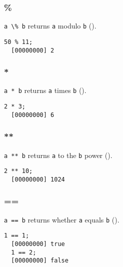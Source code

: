 \subsubsection{\%}

\lstinline|a \% b| returns \lstinline|a| modulo \lstinline|b| ().

\begin{lstlisting}[caption=Float.'\%', label=lst:float-mod, float=\floatposh]
  50 % 11;
  [00000000] 2
\end{lstlisting}

\subsubsection{*}

\lstinline|a * b| returns \lstinline|a| times \lstinline|b| ().

\begin{lstlisting}[caption=Float.'*', label=lst:float-times, float=\floatposh]
  2 * 3;
  [00000000] 6
\end{lstlisting}

\subsubsection{**}

\lstinline|a ** b| returns \lstinline|a| to the \lstinline|b| power ().

\begin{lstlisting}[caption=Float.'**', label=lst:float-exp, float=\floatposh]
  2 ** 10;
  [00000000] 1024
\end{lstlisting}

\subsubsection{==}

\lstinline|a == b| returns whether \lstinline|a| equals \lstinline|b| ().

\begin{lstlisting}[caption={Float.'=='}, label=lst:float-eq, float=\floatposh]
  1 == 1;
  [00000000] true
  1 == 2;
  [00000000] false
\end{lstlisting}
